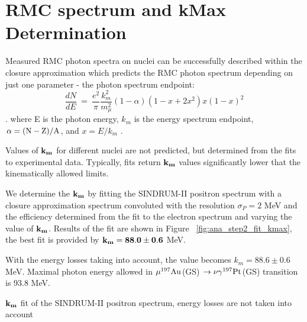 \newpage
\section {RMC spectrum and kMax Determination}

Measured RMC photon spectra on nuclei can be successfully described within 
the closure approximation which predicts the RMC photon spectrum depending
on just one parameter - the photon spectrum endpoint:
$$
    \frac{dN}{dE} ~=~ \frac{e^2}{\pi} \frac{k_m^2}{ m_{\mu}^2} (1 - \alpha) (1-x+2x^2)x(1-x)^2
$$
. where E is the photon energy, $k_m$ is the energy spectrum endpoint, $\rm \alpha = (N-Z)/A$,
and $x = E/k_m$  \cite{Christillin_1980}.

Values of $\bf k_m$ for different nuclei are not predicted, but determined from the fits
to experimental data. Typically, fits return $\bf k_m$ values significantly lower that
the kinematically allowed limits.

We determine the $\bf k_m$ by fitting the SINDRUM-II positron spectrum with a closure approximation spectrum convoluted with the resolution $\sigma_P = 2$ MeV and the
efficiency determined from the fit to the electron spectrum and varying the value
of $\bf k_m$. Results of the fit are shown in Figure ~\ref{fig:ana_step2_fit_kmax},
the best fit is provided by $\bf k_m = 88.0 \pm 0.6$ MeV.

With the energy losses taking into account, the value becomes  $k_m = 88.6 \pm 0.6$ MeV.
Maximal photon energy allowed in  $\mu \mbox{$\rm ^{197}Au$}$(GS) $\rm \rightarrow \nu \gamma ^{197}Pt$(GS)
transition is 93.8 MeV.

\vspace{0.1in}
 {
  \label{fig:ana_step2_fit_kmax}
  $\bf k_m$ fit of the SINDRUM-II positron spectrum, energy losses are not
  taken into account
}
\vspace{0.1in}


